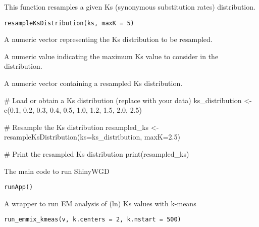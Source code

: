 \documentclass[a4paper]{book}
\begin{document}
%
\begin{Description}\relax
This function resamples a given Ks (synonymous substitution rates) distribution.
\end{Description}
%
\begin{Usage}
\begin{verbatim}
resampleKsDistribution(ks, maxK = 5)
\end{verbatim}
\end{Usage}
%
\begin{Arguments}
\begin{ldescription}
\item[\code{ks}] A numeric vector representing the Ks distribution to be resampled.

\item[\code{maxK}] A numeric value indicating the maximum Ks value to consider in the distribution.
\end{ldescription}
\end{Arguments}
%
\begin{Value}
A numeric vector containing a resampled Ks distribution.
\end{Value}
%
\begin{Examples}
\begin{ExampleCode}
# Load or obtain a Ks distribution (replace with your data)
ks_distribution <- c(0.1, 0.2, 0.3, 0.4, 0.5, 1.0, 1.2, 1.5, 2.0, 2.5)

# Resample the Ks distribution
resampled_ks <- resampleKsDistribution(ks=ks_distribution, maxK=2.5)

# Print the resampled Ks distribution
print(resampled_ks)
\end{ExampleCode}
\end{Examples}
%
\begin{Description}\relax
The main code to run ShinyWGD
\end{Description}
%
\begin{Usage}
\begin{verbatim}
runApp()
\end{verbatim}
\end{Usage}
%
\begin{Description}\relax
A wrapper to run EM analysis of \bsl{}(ln\bsl{}) Ks values with k-means
\end{Description}
%
\begin{Usage}
\begin{verbatim}
run_emmix_kmeas(v, k.centers = 2, k.nstart = 500)
\end{verbatim}
\end{Usage}
\end{document}
